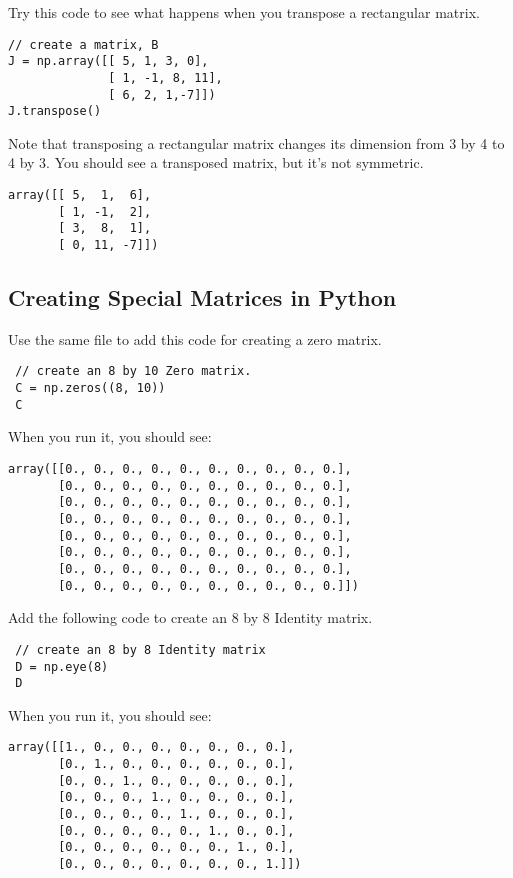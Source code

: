 Try this code to see what happens when you transpose a rectangular matrix. 
\begin{Verbatim}
// create a matrix, B
J = np.array([[ 5, 1, 3, 0], 
              [ 1, -1, 8, 11], 
              [ 6, 2, 1,-7]])
J.transpose()
\end{Verbatim}
Note that transposing a rectangular matrix changes its dimension from 3 by 4 to 4 by 3. You should see a transposed matrix, but it's not symmetric.
\begin{Verbatim}
array([[ 5,  1,  6],
       [ 1, -1,  2],
       [ 3,  8,  1],
       [ 0, 11, -7]])
\end{Verbatim}

\subsection{Creating Special Matrices in Python}
 Use the same file to add this code for creating a zero matrix.
\begin{Verbatim}
 // create an 8 by 10 Zero matrix.
 C = np.zeros((8, 10))
 C
\end{Verbatim}
When you run it, you should see:
\begin{Verbatim}
array([[0., 0., 0., 0., 0., 0., 0., 0., 0., 0.],
       [0., 0., 0., 0., 0., 0., 0., 0., 0., 0.],
       [0., 0., 0., 0., 0., 0., 0., 0., 0., 0.],
       [0., 0., 0., 0., 0., 0., 0., 0., 0., 0.],
       [0., 0., 0., 0., 0., 0., 0., 0., 0., 0.],
       [0., 0., 0., 0., 0., 0., 0., 0., 0., 0.],
       [0., 0., 0., 0., 0., 0., 0., 0., 0., 0.],
       [0., 0., 0., 0., 0., 0., 0., 0., 0., 0.]])
\end{Verbatim}
Add the following code to create an 8 by 8 Identity matrix.
\begin{Verbatim}
 // create an 8 by 8 Identity matrix 
 D = np.eye(8)
 D
\end{Verbatim}
When you run it, you should see:
\begin{Verbatim}
array([[1., 0., 0., 0., 0., 0., 0., 0.],
       [0., 1., 0., 0., 0., 0., 0., 0.],
       [0., 0., 1., 0., 0., 0., 0., 0.],
       [0., 0., 0., 1., 0., 0., 0., 0.],
       [0., 0., 0., 0., 1., 0., 0., 0.],
       [0., 0., 0., 0., 0., 1., 0., 0.],
       [0., 0., 0., 0., 0., 0., 1., 0.],
       [0., 0., 0., 0., 0., 0., 0., 1.]])
\end{Verbatim}


